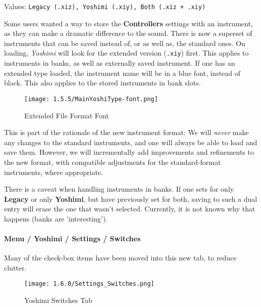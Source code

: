    Values: \texttt{Legacy (.xiz), Yoshimi (.xiy), Both (.xiz + .xiy)}

	Some users wanted a way to store the \textbf{Controllers} settings
   with an instrument, as they can make a dramatic difference to the
   sound. There is now a superset of instruments that can be saved instead of,
   or as well as, the standard ones. On loading, \textsl{Yoshimi}
   will look for the extended version (\texttt{.xiy}) first.
   This applies to instruments in banks, as well as
   externally saved instrument.
   If one has an extended type loaded, the instrument
   name will be in a blue font, instead of black.
   This also applies to the stored instruments in bank slots.

\begin{figure}[H]
   \centering
   \texttt{[image: 1.5.5/MainYoshiType-font.png]}
   \caption[Yoshimi Font for Extended File Format]{Extended File Format Font}
   \label{fig:extended_file_format_font}
\end{figure}

   This is part of the rationale of the new instrument format: We will
   \textsl{never} make any changes to the standard instruments, and one will always
   be able to load and save them. However, we will incrementally add improvements
   and refinements to the new format, with compatible
   adjustments for the standard-format instruments, where appropriate.

   There is a caveat when handling instruments in banks. If one sets for only
   \textbf{Legacy} or only \textbf{Yoshimi}, but have previously set for both,
   saving to such a dual entry will erase the one that wasn't selected. Currently,
   it is not known why that happens (banks are 'interesting').

\paragraph{Menu / Yoshimi / Settings / Switches}
\label{paragraph:menu_yoshimi_settings_switches}

   Many of the check-box items have been moved into this new tab, to reduce
   clutter.

\begin{figure}[H]
   \centering
   \texttt{[image: 1.6.0/Settings\_Switches.png]}
   \caption{Yoshimi Switches Tab}
   \label{fig:yoshimi_settings_switches_tab}
\end{figure}

